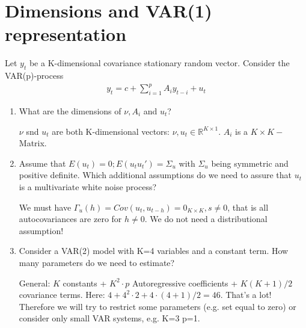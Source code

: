 \documentclass[a4paper]{scrartcl}
\begin{document}
\section{Dimensions and VAR(1) representation}
Let $y_t$ be a K-dimensional covariance stationary random vector. Consider the VAR(p)-process
\begin{align*}
y_t = c + \sum_{i=1}^p A_i {y_{t-i}} + u_t
\end{align*}
\begin{enumerate}
\item What are the dimensions of $\nu, A_i$ and $u_{t}$?
\begin{solution}
	$\nu$ snd $u_t$ are both K-dimensional vectors: $\nu,u_t \in \mathbb{R}^{K \times 1}$. $A_i$ is a $K \times K-$Matrix.
\end{solution}
\item Assume that $E(u_t) = 0; E(u_t u_t') = \Sigma_u$ with $\Sigma_u$ being symmetric and positive definite. Which additional assumptions do we need to assure that $u_t$ is a multivariate white noise process?
\begin{solution}
	
		We must have ${\Gamma_u(h)} = Cov(u_t, u_{t-h}) = 0_{K\times K},s\neq0$, that is all autocovariances are zero for $h\neq0$. We do not need a distributional assumption!
\end{solution}
\item Consider a VAR(2) model with K=4 variables and a constant term. How many parameters do we need to estimate?
\begin{solution}
	
		General: $K$ constants + $K^2\cdot p$ Autoregressive coefficients + $K(K+1)/2$ covariance terms. Here: $4+4^2\cdot2+4\cdot(4+1)/2=46$. That's a lot! Therefore we will try to restrict some parameters (e.g. set equal to zero) or consider only small VAR systems, e.g. K=3 p=1.
	

\end{solution}
\end{enumerate}
\end{document}
